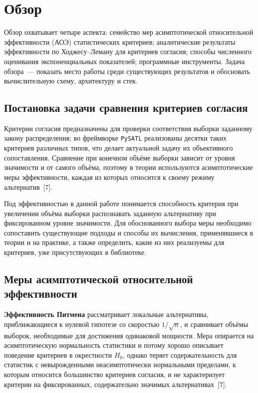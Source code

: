 ﻿\section{Обзор}
\label{sec:review}

Обзор охватывает четыре аспекта: семейство мер асимптотической относительной эффективности
(АОЭ) статистических критериев; аналитические результаты эффективности по
Ходжесу--Леману для критериев согласия; способы численного оценивания экспоненциальных
показателей; программные инструменты.
Задача обзора~--- показать место работы среди
существующих результатов и обосновать вычислительную схему, архитектуру и стек.

\subsection{Постановка задачи сравнения критериев согласия}
\label{ssec:statement}

Критерии согласия предназначены для проверки соответствия выборки заданному закону
распределения; во фреймворке \texttt{PySATL} реализованы десятки таких критериев различных
типов, что делает актуальной задачу их объективного сопоставления. Сравнение при конечном
объёме выборки зависит от уровня значимости и от самого объёма, поэтому в теории
используются асимптотические меры эффективности, каждая из которых относится к своему
режиму альтернатив~[7].

Под эффективностью в данной работе понимается способность критерия при увеличении объёма
выборки распознавать заданную альтернативу при фиксированном уровне значимости. Для
обоснованного выбора меры необходимо сопоставить существующие подходы и способы их
вычисления, применявшиеся в теории и на практике, а также определить, какие из них
реализуемы для критериев, уже присутствующих в библиотеке.

\subsection{Меры асимптотической относительной эффективности}
\label{ssec:measures}

\textbf{Эффективность Питмена} рассматривает локальные альтернативы, приближающиеся к
нулевой гипотезе со скоростью $1/\sqrt{n}$, и сравнивает объёмы выборок, необходимые для
достижения одинаковой мощности. Мера опирается на асимптотическую нормальность статистики и
потому хорошо описывает поведение критериев в окрестности $H_0$, однако теряет
содержательность для статистик с невырожденными неасимптотически нормальными пределами,
к которым относится большинство критериев согласия, и не характеризует критерии на
фиксированных, содержательно значимых альтернативах~[7].

